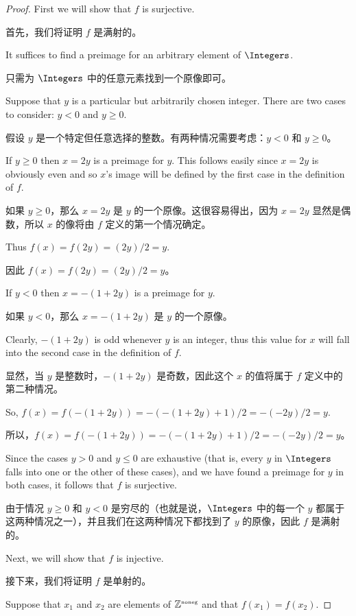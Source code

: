 \begin{proof}
First we will show that $f$ is surjective.
 
首先，我们将证明 $f$ 是满射的。

It suffices to find a preimage for an arbitrary element of $\Integers$.

只需为 $\Integers$ 中的任意元素找到一个原像即可。

Suppose that $y$ is a particular but arbitrarily chosen integer.  There 
are two cases to consider: $y<0$ and $y\geq0$.

假设 $y$ 是一个特定但任意选择的整数。有两种情况需要考虑：$y<0$ 和 $y\geq0$。

If $y\geq0$ then $x=2y$ is a preimage for $y$.  This follows easily since
$x=2y$ is obviously even and so $x$'s image will be
defined by the first case in the definition of $f$.

如果 $y\geq0$，那么 $x=2y$ 是 $y$ 的一个原像。这很容易得出，因为 $x=2y$ 显然是偶数，所以 $x$ 的像将由 $f$ 定义的第一个情况确定。

Thus $f(x) = f(2y) =
(2y)/2 = y$.

因此 $f(x) = f(2y) = (2y)/2 = y$。

If $y < 0$ then $x=-(1+2y)$ is a preimage for $y$.

如果 $y < 0$，那么 $x=-(1+2y)$ 是 $y$ 的一个原像。

Clearly, $-(1+2y)$ is odd
whenever $y$ is an integer, thus this value for $x$ will fall into the second 
case in the definition of $f$.

显然，当 $y$ 是整数时，$-(1+2y)$ 是奇数，因此这个 $x$ 的值将属于 $f$ 定义中的第二种情况。

So, $f(x) = f(-(1+2y)) = -(-(1+2y)+1)/2 = -(-2y)/2 = y$.

所以，$f(x) = f(-(1+2y)) = -(-(1+2y)+1)/2 = -(-2y)/2 = y$。

Since the cases $y>0$ and $y\leq 0$ are exhaustive (that is, every $y$ in 
$\Integers$ falls into one or the other of these cases), and we have found
a preimage for $y$ in both cases, it follows that $f$ is surjective.

由于情况 $y \geq 0$ 和 $y < 0$ 是穷尽的（也就是说，$\Integers$ 中的每一个 $y$ 都属于这两种情况之一），并且我们在这两种情况下都找到了 $y$ 的原像，因此 $f$ 是满射的。

Next, we will show that $f$ is injective.

接下来，我们将证明 $f$ 是单射的。

Suppose that $x_1$ and $x_2$ are elements of ${\mathbb Z}^{\mbox{\tiny noneg}}$ and that
$f(x_1)=f(x_2)$.


\end{proof}
